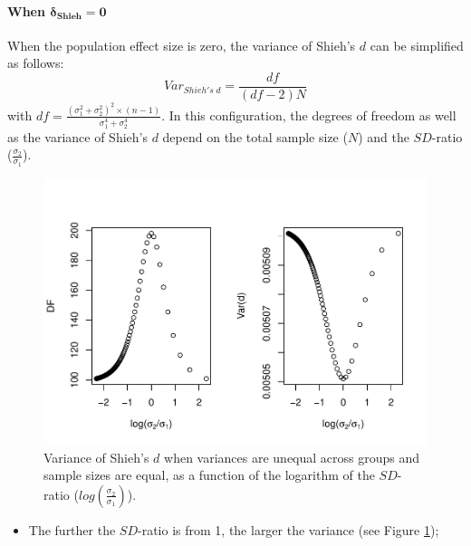 \documentclass[
  english,
  man,mask]{apa6}
\providecommand{\tightlist}{%
  \setlength{\itemsep}{0pt}\setlength{\parskip}{0pt}}
\let\oldparagraph\paragraph
\renewcommand{\paragraph}[1]{\oldparagraph{#1}\mbox{}}
\begin{document}
\hypertarget{when-bmdelta_shieh-0-1}{%
\paragraph{\texorpdfstring{When \(\bm{\delta_{Shieh} = 0}\)}{When \textbackslash bm\{\textbackslash delta\_\{Shieh\} = 0\}}}\label{when-bmdelta_shieh-0-1}}

When the population effect size is zero, the variance of Shieh's \(d\) can be simplified as follows:
\[Var_{Shieh's \; d} = \frac{df}{(df-2)N}\]
with \(df = \frac{(\sigma_1^2+\sigma_2^2)^2 \times (n-1)}{\sigma_1^4+\sigma_2^4}\). In this configuration, the degrees of freedom as well as the variance of Shieh's \(d\) depend on the total sample size (\(N\)) and the \(SD\)-ratio (\(\frac{\sigma_2}{\sigma_1}\)).

\begin{figure}
\centering
\includegraphics{Theoretical-Variance-of-all-estimators-as-a-function-of-population-parameters_files/figure-latex/varshiehhetbalSDratio2-1.pdf}
\caption{\label{fig:varshiehhetbalSDratio2}Variance of Shieh's \(d\) when variances are unequal across groups and sample sizes are equal, as a function of the logarithm of the \(SD\)-ratio (\(log \left( \frac{\sigma_2}{\sigma_1} \right)\)).}
\end{figure}

\begin{itemize}
\tightlist
\item
  The further the \(SD\)-ratio is from 1, the larger the variance (see Figure \ref{fig:varshiehhetbalSDratio2});
\end{itemize}
\end{document}
